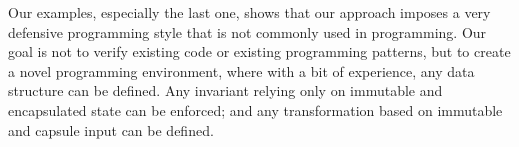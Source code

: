 

Our examples, especially the last one, shows that our approach imposes a very defensive programming style
that is not commonly used in programming.
Our goal is not to verify existing code or existing programming patterns, but to create a novel programming environment, where with a bit of experience, any data structure can be defined. 
Any invariant relying only on immutable and encapsulated state can be enforced; and any transformation based on immutable and capsule input can be defined. 


